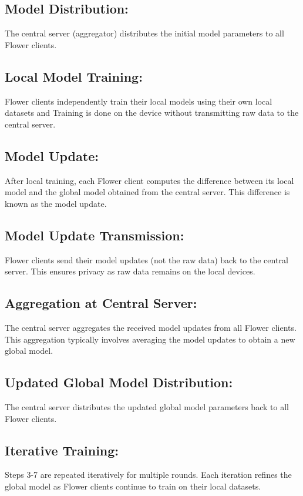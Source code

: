 \documentclass[titlepage]{article}
\begin{document}
\subsection{ Model Distribution:}
	 The central server (aggregator) distributes the initial model parameters to all Flower clients.

\subsection{Local Model Training:}
	Flower clients independently train their local models using their own local datasets and Training is done on the device without transmitting raw data to the central server.

\subsection{Model Update:}	
After local training, each Flower client computes the difference between its local model and the global model obtained from the central server. This difference is known as the model update.

\subsection{Model Update Transmission:}
Flower clients send their model updates (not the raw data) back to the central server. This ensures privacy as raw data remains on the local devices.
	
\subsection{Aggregation at Central Server:}
The central server aggregates the received model updates from all Flower clients.
This aggregation typically involves averaging the model updates to obtain a new global model.

\subsection{Updated Global Model Distribution:}
The central server distributes the updated global model parameters back to all Flower clients.

\subsection{Iterative Training:}
Steps 3-7 are repeated iteratively for multiple rounds.
Each iteration refines the global model as Flower clients continue to train on their local datasets.
\end{document}
